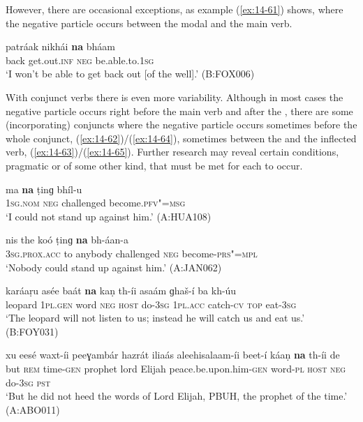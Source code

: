 However, there are occasional exceptions, as example (\ref{ex:14-61}) shows, where the negative particle occurs between the modal and the main verb.

\begin{exe}
\ex
\label{ex:14-61}
\gll patráak nikhái \textbf{na} bháam \\
back get.out.\textsc{inf} \textsc{neg} be.able.to.\textsc{1sg} \\
\glt `I won't be able to get back out [of the well].' (B:FOX006)
\end{exe}

With conjunct verbs there is even more variability. Although in most cases the negative particle occurs right before the main verb and after the , there are some (incorporating) conjuncts where the negative particle occurs sometimes before the whole conjunct, (\ref{ex:14-62})/(\ref{ex:14-64}), sometimes between the  and the inflected verb, (\ref{ex:14-63})/(\ref{ex:14-65}). Further research may reveal certain conditions, pragmatic or of some other kind, that must be met for each to occur. 

\begin{exe}
\ex
\label{ex:14-62}
\gll ma \textbf{na} ṭinɡ bhíl-u \\
\textsc{1sg.nom} \textsc{neg} challenged become.\textsc{pfv"=msg } \\
\glt `I could not stand up against him.' (A:HUA108)

\ex
\label{ex:14-63}
\gll nis the koó ṭinɡ \textbf{na} bh-áan-a \\
\textsc{3sg.prox.acc} to anybody challenged \textsc{neg} become-\textsc{prs"=mpl } \\
\glt `Nobody could stand up against him.' (A:JAN062)

\ex
\label{ex:14-64}
\gll karáaṛu asée baát \textbf{na} kaṇ th-íi asaám ɡhaš-í ba kh-úu \\
leopard \textsc{1pl.gen} word \textsc{neg} \textsc{host} do-\textsc{3sg} \textsc{1pl.acc} catch-\textsc{cv}  \textsc{top} eat-\textsc{3sg} \\
\glt `The leopard will not listen to us; instead he will catch us and eat us.' (B:FOY031)

\ex
\label{ex:14-65}
\gll xu eesé waxt-íi peeɣambár hazrát iliaás aleehisalaam-íi beet-í káaṇ \textbf{na} th-íi de \\
but \textsc{rem} time-\textsc{gen} prophet lord  Elijah peace.be.upon.him-\textsc{gen} word-\textsc{pl} \textsc{host} \textsc{neg} do-\textsc{3sg} \textsc{pst} \\
\glt `But he did not heed the words of Lord Elijah, PBUH, the prophet of the time.' (A:ABO011)
\end{exe}

